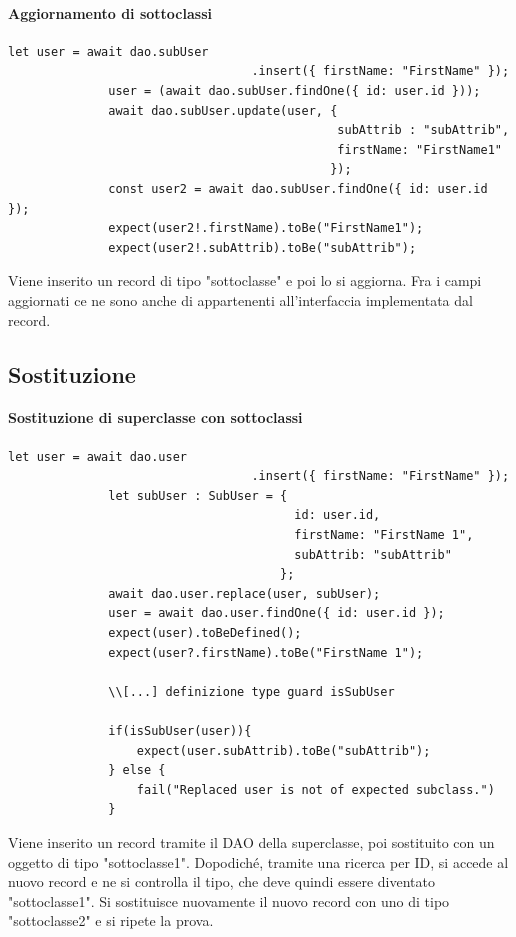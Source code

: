 \documentclass[a4paper, 12pt]{report}
\begin{document}
          \paragraph{Aggiornamento di sottoclassi}
            \begin{Verbatim}[samepage=true]
              let user = await dao.subUser
                                  .insert({ firstName: "FirstName" });
              user = (await dao.subUser.findOne({ id: user.id }));
              await dao.subUser.update(user, { 
                                              subAttrib : "subAttrib",
                                              firstName: "FirstName1"
                                             });
              const user2 = await dao.subUser.findOne({ id: user.id });
              expect(user2!.firstName).toBe("FirstName1");
              expect(user2!.subAttrib).toBe("subAttrib");
            \end{Verbatim}
            Viene inserito un record di tipo "sottoclasse" e poi lo si aggiorna.
            Fra i campi aggiornati ce ne sono anche di appartenenti all'interfaccia implementata dal record.
        \subsection{Sostituzione}
          \paragraph{Sostituzione di superclasse con sottoclassi}
            \begin{Verbatim}[samepage=true]
              let user = await dao.user
                                  .insert({ firstName: "FirstName" });
              let subUser : SubUser = { 
                                        id: user.id,
                                        firstName: "FirstName 1",
                                        subAttrib: "subAttrib"
                                      };
              await dao.user.replace(user, subUser);
              user = await dao.user.findOne({ id: user.id });
              expect(user).toBeDefined();
              expect(user?.firstName).toBe("FirstName 1");

              \\[...] definizione type guard isSubUser
          
              if(isSubUser(user)){
                  expect(user.subAttrib).toBe("subAttrib");
              } else {
                  fail("Replaced user is not of expected subclass.")
              }
            \end{Verbatim}
            Viene inserito un record tramite il DAO della superclasse, poi sostituito con un oggetto di tipo "sottoclasse1".
            Dopodiché, tramite una ricerca per ID, si accede al nuovo record e ne si controlla il tipo, che deve quindi essere diventato "sottoclasse1".
            Si sostituisce nuovamente il nuovo record con uno di tipo "sottoclasse2" e si ripete la prova.
\end{document}

